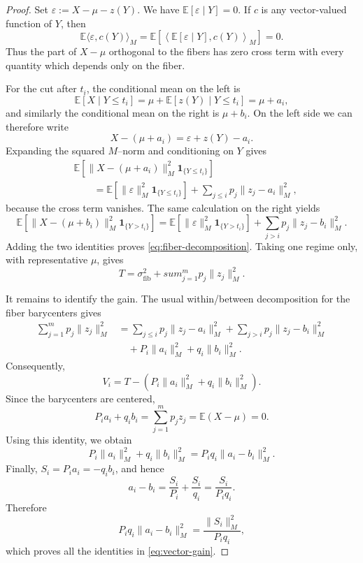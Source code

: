 \documentclass[a4paper]{amsart}
\numberwithin{equation}{section}
\theoremstyle{remark}
\newcommand{\1}{\mathbf 1}
\begin{document}
\begin{proof}
Set $\varepsilon:=X-\mu-z(Y)$.  We have
$\mathbb E[\varepsilon\mid Y]=0$.  If $c$ is any vector-valued function of
$Y$, then
\[
 \mathbb E\langle\varepsilon,c(Y)\rangle_M
 =\mathbb E\left[
   \left\langle\mathbb E[\varepsilon\mid Y],c(Y)\right\rangle_M
  \right]=0.
\]
Thus the part of $X-\mu$ orthogonal to the fibers has zero cross term with
every quantity which depends only on the fiber.

For the cut after $t_i$, the conditional mean on the left is
\[
 \mathbb E[X\mid Y\leq t_i]
 =\mu+\mathbb E[z(Y)\mid Y\leq t_i]
 =\mu+a_i,
\]
and similarly the conditional mean on the right is $\mu+b_i$.  On the left
side we can therefore write
\[
 X-(\mu+a_i)=\varepsilon+z(Y)-a_i.
\]
Expanding the squared $M$--norm and conditioning on $Y$ gives
\begin{align*}
 &\mathbb E\left[
   \|X-(\mu+a_i)\|_M^2\mathbf 1_{\{Y\leq t_i\}}
  \right]\\
 &\qquad=
 \mathbb E\left[\|\varepsilon\|_M^2
                 \mathbf 1_{\{Y\leq t_i\}}\right]
 +\sum_{j\leq i}p_j\|z_j-a_i\|_M^2,
\end{align*}
because the cross term vanishes.  The same calculation on the right yields
\[
 \mathbb E\left[
   \|X-(\mu+b_i)\|_M^2\mathbf 1_{\{Y>t_i\}}
  \right]
 =\mathbb E\left[\|\varepsilon\|_M^2
                 \mathbf 1_{\{Y>t_i\}}\right]
 +\sum_{j>i}p_j\|z_j-b_i\|_M^2.
\]
Adding the two identities proves \eqref{eq:fiber-decomposition}.  Taking one
regime only, with representative $\mu$, gives
\[
 T=\sigma^2_{\mathrm{fib}}+sum_{j=1}^m p_j\|z_j\|_M^2.
\]

It remains to identify the gain.  The usual within/between decomposition for
the fiber barycenters gives
\begin{align*}
 \sum_{j=1}^m p_j\|z_j\|_M^2
 &=\sum_{j\leq i}p_j\|z_j-a_i\|_M^2
   +\sum_{j>i}p_j\|z_j-b_i\|_M^2\\
 &\quad+P_i\|a_i\|_M^2+q_i\|b_i\|_M^2.
\end{align*}
Consequently,
\[
 V_i=T-\left(P_i\|a_i\|_M^2+q_i\|b_i\|_M^2\right).
\]
Since the barycenters are centered,
\[
 P_i a_i+q_i b_i=\sum_{j=1}^m p_jz_j
 =\mathbb E(X-\mu)=0.
\]
Using this identity, we obtain
\[
 P_i\|a_i\|_M^2+q_i\|b_i\|_M^2
 =P_iq_i\|a_i-b_i\|_M^2.
\]
Finally, $S_i=P_i a_i=-q_i b_i$, and hence
\[
 a_i-b_i=\frac{S_i}{P_i}+\frac{S_i}{q_i}
          =\frac{S_i}{P_iq_i}.
\]
Therefore
\[
 P_iq_i\|a_i-b_i\|_M^2
 =\frac{\|S_i\|_M^2}{P_iq_i},
\]
which proves all the identities in \eqref{eq:vector-gain}.
\end{proof}
\end{document}
